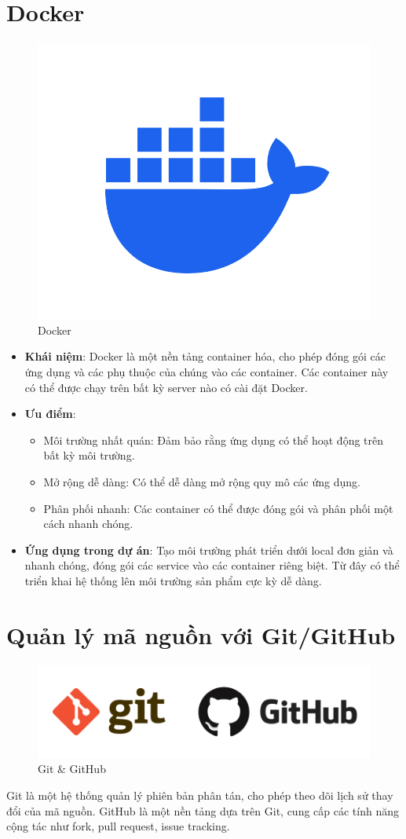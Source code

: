 \documentclass[../index.tex]{subfiles}
\begin{document}
    \section{Docker}
    \begin{figure}[H]
        \centering
        \includegraphics[width=0.2\linewidth]{figures/tech-logo/docker.png}
        \caption{Docker}
    \end{figure}
    \begin{itemize}
        \item \textbf{Khái niệm}: Docker là một nền tảng container hóa, cho
            phép đóng gói các ứng dụng và các phụ thuộc của chúng vào các
            container. Các container này có thể được chạy trên bất kỳ server nào
            có cài đặt Docker.

        \item \textbf{Ưu điểm}:
            \begin{itemize}
                \item Môi trường nhất quán: Đảm bảo rằng ứng dụng có thể hoạt
                    động trên bất kỳ môi trường.

                \item Mở rộng dễ dàng: Có thể dễ dàng mở rộng quy mô các ứng
                    dụng.

                \item Phân phối nhanh: Các container có thể được đóng gói và
                    phân phối một cách nhanh chóng.
            \end{itemize}

        \item \textbf{Ứng dụng trong dự án}: Tạo môi trường phát triển dưới local
            đơn giản và nhanh chóng, đóng gói các service vào các container
            riêng biệt. Từ đây có thể triển khai hệ thống lên môi trường sản phẩm
            cực kỳ dễ dàng.
    \end{itemize}

    \section{Quản lý mã nguồn với Git/GitHub}
    \begin{figure}[H]
        \centering
        \includegraphics[width=0.6\linewidth]{figures/tech-logo/git-github.png}
        \caption{Git \& GitHub}
    \end{figure}
    Git là một hệ thống quản lý phiên bản phân tán, cho phép theo dõi lịch sử
    thay đổi của mã nguồn. GitHub là một nền tảng dựa trên Git, cung cấp các
    tính năng cộng tác như fork, pull request, issue tracking.
\end{document}
